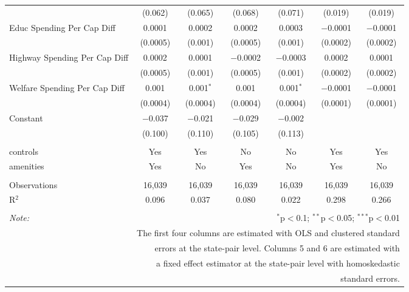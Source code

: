 \begin{table}[!htbp]
\begin{tabular}{@{\extracolsep{5pt}}lcccccc}
  & (0.062) & (0.065) & (0.068) & (0.071) & (0.019) & (0.019) \\ 
  Educ Spending Per Cap Diff & 0.0001 & 0.0002 & 0.0002 & 0.0003 & $-$0.0001 & $-$0.0001 \\ 
  & (0.0005) & (0.001) & (0.0005) & (0.001) & (0.0002) & (0.0002) \\ 
  Highway Spending Per Cap Diff & 0.0002 & 0.0001 & $-$0.0002 & $-$0.0003 & 0.0002 & 0.0001 \\ 
  & (0.0005) & (0.001) & (0.0005) & (0.001) & (0.0002) & (0.0002) \\ 
  Welfare Spending Per Cap Diff & 0.001 & 0.001$^{*}$ & 0.001 & 0.001$^{*}$ & $-$0.0001 & $-$0.0001 \\ 
  & (0.0004) & (0.0004) & (0.0004) & (0.0004) & (0.0001) & (0.0001) \\ 
  Constant & $-$0.037 & $-$0.021 & $-$0.029 & $-$0.002 &  &  \\ 
  & (0.100) & (0.110) & (0.105) & (0.113) &  &  \\ 
 \hline \\[-1.8ex] 
controls & Yes & Yes & No & No & Yes & Yes \\ 
amenities & Yes & No & Yes & No & Yes & No \\ 
\hline \\[-1.8ex] 
Observations & 16,039 & 16,039 & 16,039 & 16,039 & 16,039 & 16,039 \\ 
R$^{2}$ & 0.096 & 0.037 & 0.080 & 0.022 & 0.298 & 0.266 \\ 
\hline 
\hline \\[-1.8ex] 
\textit{Note:}  & \multicolumn{6}{r}{$^{*}$p$<$0.1; $^{**}$p$<$0.05; $^{***}$p$<$0.01} \\ 
 & \multicolumn{6}{r}{The first four columns are estimated with OLS and clustered standard} \\ 
 & \multicolumn{6}{r}{ errors at the state-pair level. Columns 5 and 6 are estimated with} \\ 
 & \multicolumn{6}{r}{a fixed effect estimator at the state-pair level with homoskedastic} \\ 
 & \multicolumn{6}{r}{standard errors.} \\ 
\end{tabular} 
\end{table} 
